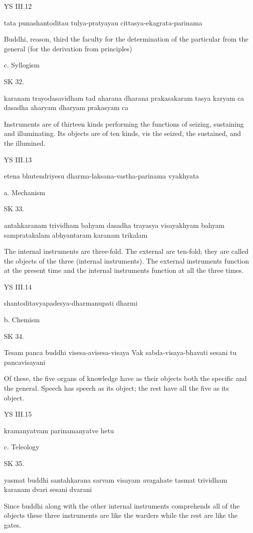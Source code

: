 YS III.12

    tata punashantoditau tulya-pratyayau cittasya-ekagrata-parinama

    Buddhi, reason, third the faculty for the determination of
    the particular from the general (for the derivation from principles)

    c. Syllogism

SK 32.

karanam trayodasavidham tad aharana dharana prakasakaram
tasya karyam ca dasadha aharyam dharyam prakasyam ca

Instruments are of thirteen kinds performing the functions of
seizing, sustaining and illuminating.
Its objects are of ten kinds, vis
the seized, the sustained, and the illumined.

YS III.13

    etena bhutendriyesu dharma-laksana-vastha-parinama vyakhyata

    a. Mechanism

SK 33.

antahkaranam trividham bahyam dasadha trayasya visayakhyam
bahyam sampratakalam abhyantaram karanam trikalam

The internal instruments are three-fold.
The external are ten-fold; they are called the objects of the three (internal instruments).
The external instruments function at the present time and
the internal instruments function at all the three times.

YS III.14

    shantoditavyapadesya-dharmanupati dharmi

    b. Chemism

SK 34.

Tesam panca buddhi visesa-avisesa-visaya
Vak sabda-visaya-bhavati sesani tu pancavisayani

Of these, the five organs of knowledge have as their objects
both the specific and the general.
Speech has speech as its object;
the rest have all the five as its object.

YS III.15

    kramanyatvam parinamanyatve hetu

    c. Teleology

SK 35.


yasmat buddhi santahkarana sarvam visayam avagahate
tasmat trividham karanam dvari sesani dvarani

Since buddhi along with the other internal instruments
comprehends all of the objects these three instruments are
like the warders while the rest are like the gates.


